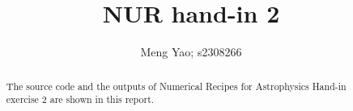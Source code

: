 \documentclass[a4paper,10pt]{article}
\title{NUR hand-in 2}
\author{Meng Yao; s2308266}
\begin{document}
\maketitle

\begin{abstract}
 The source code and the outputs of Numerical Recipes for Astrophysics Hand-in exercise 2 are shown in this report.
\end{abstract}















%

%
\end{document}
